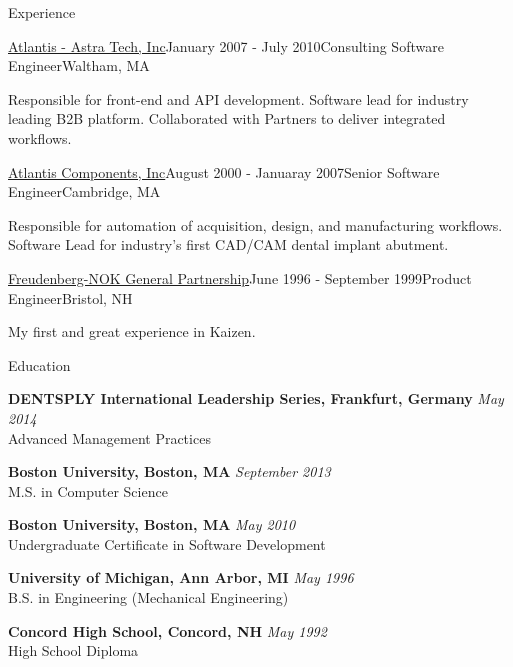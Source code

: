 \documentclass{resume}
\begin{document}
\begin{rSection}{Experience}
\begin{rSubsection}{\href{https://dentsplysirona.com}{Atlantis - Astra Tech, Inc}}{January 2007 - July 2010}{Consulting Software Engineer}{Waltham, MA}
\item Responsible for front-end and API development. Software lead for industry leading B2B platform. Collaborated with Partners to deliver integrated workflows.
\end{rSubsection}

\begin{rSubsection}{\href{https://dentsplysirona.com}{Atlantis Components, Inc}}{August 2000 - Januaray 2007}{Senior Software Engineer}{Cambridge, MA}
\item Responsible for automation of acquisition, design, and manufacturing workflows. Software Lead for industry's first CAD/CAM dental implant abutment.
\end{rSubsection}

\pagebreak

\begin{rSubsection}{\href{https://fst.com}{Freudenberg-NOK General Partnership}}{June 1996 - September 1999}{Product Engineer}{Bristol, NH}
\item My first and great experience in Kaizen.
\end{rSubsection}

\end{rSection}

\begin{rSection}{Education}

\item {\bf DENTSPLY International Leadership Series, Frankfurt, Germany} \hfill {\em May 2014} \\
Advanced Management Practices

\item {\bf Boston University, Boston, MA} \hfill {\em September 2013} \\
M.S. in Computer Science

\item {\bf Boston University, Boston, MA} \hfill {\em May 2010} \\
Undergraduate Certificate in Software Development

\item {\bf University of Michigan, Ann Arbor, MI} \hfill {\em May 1996} \\
B.S. in Engineering (Mechanical Engineering)

\item {\bf Concord High School, Concord, NH} \hfill {\em May 1992} \\
High School Diploma

\end{rSection}
\end{document}
